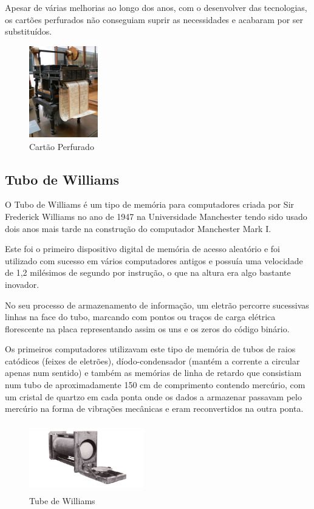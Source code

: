 \documentclass{report}
\begin{document}
		Apesar de várias melhorias ao longo dos anos, com o desenvolver das tecnologias, os cartões perfurados não conseguiam suprir as necessidades e acabaram por ser substituídos.
		
		\begin{figure}[h]
		\centering
		\includegraphics[width=3cm, height=4cm]{cartaoperfurado.jpg}
		\caption{Cartão Perfurado}
		\end{figure}
\newpage

		\subsection{Tubo de Williams}
		O Tubo de Williams é um tipo de memória para computadores criada por Sir Frederick Williams no ano de 1947 na Universidade Manchester tendo sido usado dois anos mais tarde na construção do computador Manchester Mark I.
	
	Este foi o primeiro dispositivo digital de memória de acesso aleatório e foi utilizado com sucesso em vários computadores antigos e possuía uma velocidade de 1,2 milésimos de segundo por instrução, o que na altura era algo bastante inovador.
	
	No seu processo de armazenamento de informação, um eletrão percorre sucessivas linhas na face do tubo, marcando com pontos ou traços de carga elétrica florescente na placa representando assim os uns e os zeros do código binário.
	
	Os primeiros computadores utilizavam este tipo de memória de tubos de raios catódicos (feixes de eletrões), díodo-condensador (mantém a corrente a circular apenas num sentido) e também as memórias de linha de retardo que consistiam num tubo de aproximadamente 150 cm de comprimento contendo mercúrio, com um cristal de quartzo em cada ponta onde os dados a armazenar passavam pelo mercúrio na forma de vibrações mecânicas e eram reconvertidos na outra ponta.
\\

	\begin{figure}[h]
		\centering
		\includegraphics[width=5cm, height=3cm]{williamstube.jpg}
		\caption{Tube de Williams}
		\end{figure}	
\newpage
\end{document}
